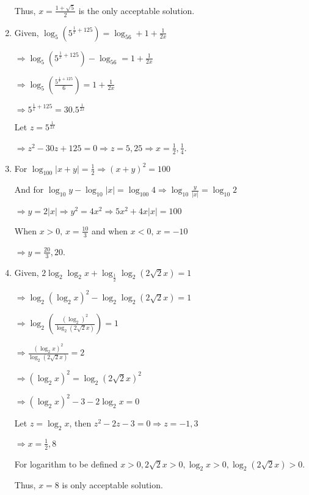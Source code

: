 \begin{enumerate}
  Thus, $x = \frac{1+\sqrt{5}}{2}$ is the only acceptable solution.
\item Given, $\log_5\left(5^{\tfrac{1}{x} + 125}\right) = \log_56 + 1 + \frac{1}{2x}$

  $\Rightarrow \log_5\left(5^{\tfrac{1}{x} + 125}\right) - \log_56 = 1 + \frac{1}{2x}$

  $\Rightarrow \log_5\left(\tfrac{5^{\tfrac{1}{x} + 125}}{6}\right) = 1 + \frac{1}{2x}$

  $\Rightarrow 5^{\tfrac{1}{x} + 125} = 30.5^{\tfrac{1}{2x}}$

  Let $z= 5^{\tfrac{1}{2x}}$

  $\Rightarrow z^2 - 30z + 125 = 0 \Rightarrow z = 5, 25 \Rightarrow x = \frac{1}{2}, \frac{1}{4}$.
\item For $\log_{100}|x + y| = \frac{1}{2} \Rightarrow (x + y)^2 = 100$

  And for $\log_{10}y - \log_{10}|x| = \log_{100}4\Rightarrow \log_{10}\frac{y}{|x|} = \log_{10}2$

  $\Rightarrow y = 2|x| \Rightarrow y^2 = 4x^2 \Rightarrow 5x^2 + 4x|x| = 100$

  When $x > 0,\, x = \frac{10}{3}$ and when $x < 0,\,x = -10$

  $\Rightarrow y = \frac{20}{3}, 20$.
\item Given, $2\log_2\log_2x + \log_{\tfrac{1}{2}}\log_2(2\sqrt{2}x) = 1$

  $\Rightarrow \log_2(\log_2x)^2 - \log_2\log_2(2\sqrt{2}x) = 1$

  $\Rightarrow \log_2\left(\frac{(\log_2)^2}{\log_2(2\sqrt{2}x)}\right) = 1$

  $\Rightarrow \frac{(\log_2x)^2}{\log_2(2\sqrt{2}x)} = 2$

  $\Rightarrow (\log_2x)^2 = \log_2(2\sqrt{2}x)^2$

  $\Rightarrow (\log_2x)^2 - 3 - 2\log_2x = 0$

  Let $z = \log_2x$, then $z^2 - 2z - 3 = 0 \Rightarrow z = -1, 3$

  $\Rightarrow x = \frac{1}{2}, 8$

  For logarithm to be defined $x > 0, 2\sqrt{2}x > 0,\log_2x > 0, \log_2(2\sqrt{2}x) > 0$.

  Thus, $x = 8$ is only acceptable solution.
\end{enumerate}
